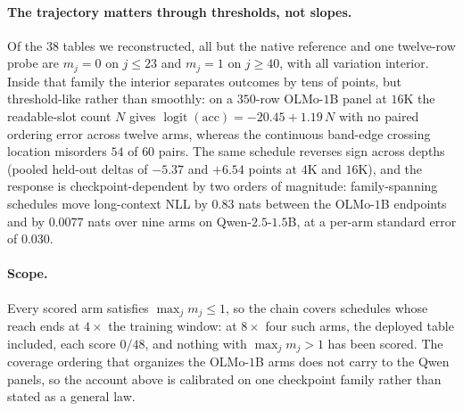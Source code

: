 \paragraph{The trajectory matters through thresholds, not slopes.}
Of the $38$ tables we reconstructed, all but the native reference and one twelve-row probe are
$m_j=0$ on $j\le23$ and $m_j=1$ on $j\ge40$, with all variation interior. Inside that family
the interior separates outcomes by tens of points, but threshold-like rather than smoothly: on
a $350$-row OLMo-$1$B panel at $16$K the readable-slot count $N$ gives
$\operatorname{logit}(\mathrm{acc})=-20.45+1.19\,N$ with no paired ordering error across twelve
arms, whereas the continuous band-edge crossing location misorders $54$ of $60$ pairs. The same
schedule reverses sign across depths (pooled held-out deltas of $-5.37$ and $+6.54$ points at
$4$K and $16$K), and the response is checkpoint-dependent by two orders of magnitude:
family-spanning schedules move long-context NLL by $0.83$ nats between the OLMo-$1$B endpoints
and by $0.0077$ nats over nine arms on Qwen-$2.5$-$1.5$B, at a per-arm standard error of
$0.030$.

\paragraph{Scope.} Every scored arm satisfies $\max_j m_j\le1$, so the chain covers schedules
whose reach ends at $4\times$ the training window: at $8\times$ four such arms, the deployed
table included, each score $0/48$, and nothing with $\max_j m_j>1$ has been scored. The
coverage ordering that organizes the OLMo-$1$B arms does not carry to the Qwen panels, so the
account above is calibrated on one checkpoint family rather than stated as a general law.
